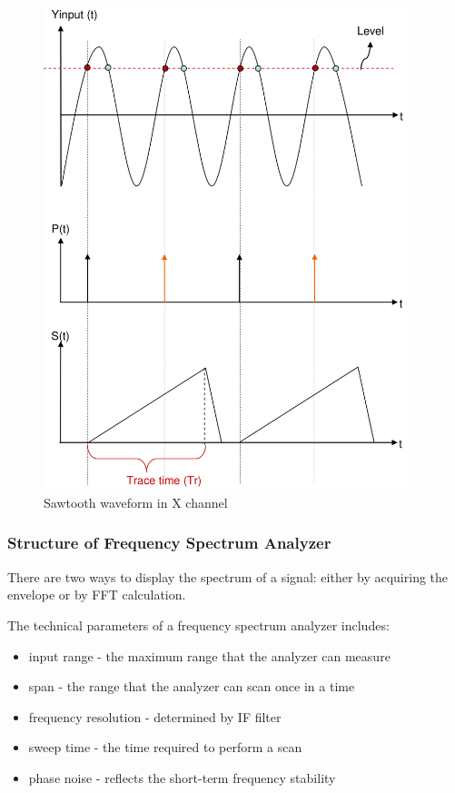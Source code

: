 \begin{figure}
  \centering
  \includegraphics[width=4.2in]{fig/fig_X_channel.png}
  \caption{Sawtooth waveform in X channel}\label{fig_X_channel}
\end{figure}

\subsubsection{Structure of Frequency Spectrum Analyzer}

There are two ways to display the spectrum of a signal: either by acquiring the envelope or by FFT calculation.

The technical parameters of a frequency spectrum analyzer includes:
\begin{itemize}
  \item input range - the maximum range that the analyzer can measure
  \item span - the range that the analyzer can scan once in a time
  \item frequency resolution - determined by IF filter
  \item sweep time - the time required to perform a scan
  \item phase noise - reflects the short-term frequency stability
\end{itemize}

